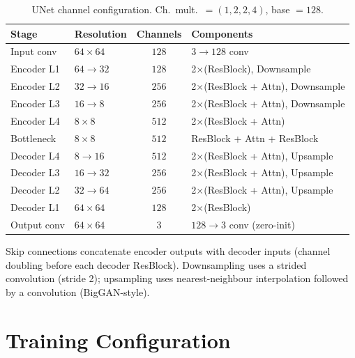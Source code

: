 \documentclass[12pt, a4paper]{report}
\begin{document}
\begin{table}[H]
\centering
\caption{UNet channel configuration. Ch.\ mult.\ $= (1, 2, 2, 4)$, base $= 128$.}
\begin{tabular}{llcl}
\toprule
Stage & Resolution & Channels & Components \\
\midrule
Input conv   & $64\times64$ & $128$ & $3\to128$ conv \\
Encoder L1   & $64\to32$    & $128$ & 2$\times$(ResBlock), Downsample \\
Encoder L2   & $32\to16$    & $256$ & 2$\times$(ResBlock + Attn), Downsample \\
Encoder L3   & $16\to8$     & $256$ & 2$\times$(ResBlock + Attn), Downsample \\
Encoder L4   & $8\times8$   & $512$ & 2$\times$(ResBlock + Attn) \\
Bottleneck   & $8\times8$   & $512$ & ResBlock + Attn + ResBlock \\
Decoder L4   & $8\to16$     & $512$ & 2$\times$(ResBlock + Attn), Upsample \\
Decoder L3   & $16\to32$    & $256$ & 2$\times$(ResBlock + Attn), Upsample \\
Decoder L2   & $32\to64$    & $256$ & 2$\times$(ResBlock + Attn), Upsample \\
Decoder L1   & $64\times64$ & $128$ & 2$\times$(ResBlock) \\
Output conv  & $64\times64$ & $3$   & $128\to3$ conv (zero-init) \\
\bottomrule
\end{tabular}
\end{table}

Skip connections concatenate encoder outputs with decoder inputs (channel doubling before
each decoder ResBlock).
Downsampling uses a strided convolution (stride 2); upsampling uses nearest-neighbour
interpolation followed by a convolution (BigGAN-style).

\section{Training Configuration}
\end{document}
